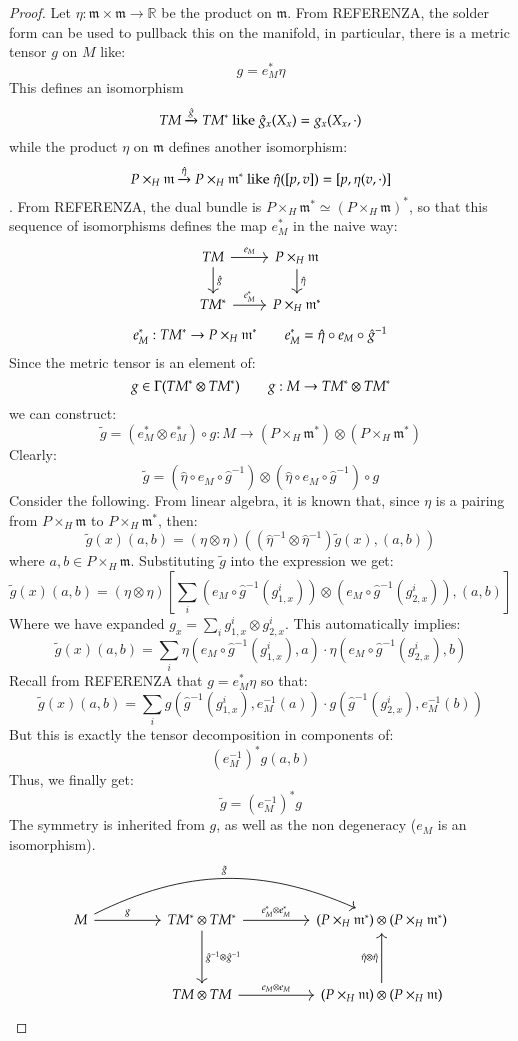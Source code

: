 \documentclass[12pt,a4paper]{report}
\theoremstyle{definition}
\theoremstyle{Theorem}
\theoremstyle{break}
\theoremstyle{definition}
\begin{document}
	\begin{proof}
		Let $\eta:\mathfrak{m}\times\mathfrak{m}\rightarrow \mathbb{R}$ be the product on $\mathfrak{m}$. From REFERENZA, the solder form can be used to pullback this on the manifold, in particular, there is a metric tensor $g$ on $M$ like:
		$$g=e_M^*\eta$$ 
		This defines an isomorphism $$TM\xrightarrow{\hat{g}} TM^* \hbox{ like }\hat{g}_x(X_x)=g_x(X_x,\cdot)$$ while the product $\eta$ on $\mathfrak{m}$ defines another isomorphism:
		$$P\times_H \mathfrak{m}\xrightarrow{\hat{\eta}} P\times_H\mathfrak{m}^*\hbox{ like }\hat{\eta}([p,v])=[p,\eta(v,\cdot)]$$. From REFERENZA, the dual bundle is $P\times_H \mathfrak{m}^*\simeq (P\times_H\mathfrak{m})^*$, so that this sequence of isomorphisms defines the map $e_M^*$ in the naive way:
		$$
		\begin{tikzcd}
			TM\arrow{d}{\hat{g}}\arrow{r}{e_M} &P\times_H\mathfrak{m}\arrow{d}{\hat{\eta}}\\
			TM^*\arrow{r}{e_M^*}&P\times_H\mathfrak{m}^*
		\end{tikzcd}
		$$
		$$e_M^*:TM^*\rightarrow P\times_H\mathfrak{m}^* \hspace{20 pt} e_M^*=\hat{\eta}\circ e_M\circ \hat{g}^{-1}$$
		Since the metric tensor is an element of:
		$$g\in\Gamma(TM^*\otimes TM^*)\hspace{20 pt}g:M\rightarrow TM^*\otimes TM^*$$
		we can construct:
		$$\tilde{g}=(e_M^*\otimes e_M^*)\circ g:M\rightarrow (P\times_H \mathfrak{m}^*)\otimes (P\times_H \mathfrak{m}^*)$$
		Clearly:
		$$\tilde{g}=(\hat{\eta}\circ e_M\circ \hat{g}^{-1} )\otimes(\hat{\eta}\circ e_M\circ \hat{g}^{-1} )\circ g$$
		Consider the following. From linear algebra, it is known that, since $\eta$ is a pairing from $P\times_H \mathfrak{m}$ to $P\times_H \mathfrak{m}^*$, then:
		$$\tilde{g}(x)(a,b)=(\eta\otimes \eta)((\hat{\eta}^{-1}\otimes \hat{\eta}^{-1})\tilde{g}(x),(a,b))$$
		where $a,b\in P\times_H\mathfrak{m}$.
		Substituting $\tilde{g}$ into the expression we get:
		$$\tilde{g}(x)(a,b)=(\eta\otimes \eta)[\sum_i (e_M\circ \hat{g}^{-1}(g^i_{1,x}))\otimes (e_M\circ \hat{g}^{-1}(g^i_{2,x})),(a,b)]$$
		Where we have expanded $g_x=\sum_{i}g^i_{1,x}\otimes g^i_{2,x}$. This automatically implies:
		$$\tilde{g}(x)(a,b)=\sum_i \eta(e_M\circ \hat{g}^{-1}(g^i_{1,x}),a)\cdot \eta(e_M\circ \hat{g}^{-1}(g^i_{2,x}),b)$$
		Recall from REFERENZA that $g=e_M^*\eta$ so that:
		$$\tilde{g}(x)(a,b)=\sum_i g(\hat{g}^{-1}(g^i_{1,x}),e_M^{-1}(a))\cdot g(\hat{g}^{-1}(g^i_{2,x}),e_M^{-1}(b))$$
		But this is exactly the tensor decomposition in components of:
		$$(e_M^{-1})^*g(a,b)$$
		Thus, we finally get:
		$$\tilde{g}=(e_M^{-1})^*g$$
		The symmetry is inherited from $g$, as well as the non degeneracy ($e_M$ is an isomorphism).
		$$
		\begin{tikzcd}
			M \arrow{rr}{g} \arrow[bend left=25]{rrrr}{\tilde{g}} && TM^*\otimes TM^* \arrow{rr}{e_M^*\otimes e_M^*} \arrow{dd}{\hat{g}^{-1}\otimes \hat{g}^{-1}} && (P\times_H \mathfrak{m}^*)\otimes (P\times_H \mathfrak{m}^*)\\\\
			&& TM\otimes TM \arrow{rr}{e_M\otimes e_M} && (P\times_H \mathfrak{m})\otimes (P\times_H \mathfrak{m}) \arrow{uu}{\hat{\eta}\otimes \hat{\eta}}
		\end{tikzcd}
		$$
	\end{proof}
\end{document}
